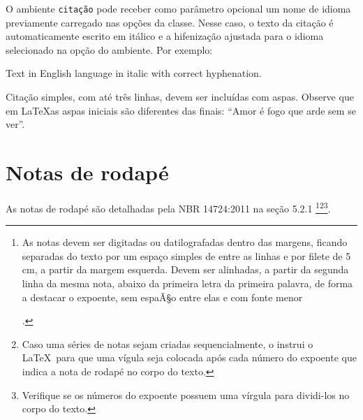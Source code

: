 O ambiente \texttt{citação} pode receber como parâmetro opcional um nome de idioma previamente carregado nas opções da classe. Nesse caso, o texto da citação é automaticamente escrito em itálico e a hifenização ajustada para o idioma selecionado na opção do ambiente. Por exemplo:
\begin{citacao}[english]
	Text in English language in italic with correct hyphenation.
\end{citacao}


Citação simples, com até três linhas, devem ser
incluídas com aspas. Observe que em \LaTeX  as aspas iniciais são diferentes das finais: ``Amor é fogo que arde sem se ver''.


\section{Notas de rodapé}


As notas de rodapé são detalhadas pela NBR 14724:2011 na seção 5.2.1
\footnote{As notas devem ser digitadas ou datilografadas dentro das margens, ficando
	separadas do texto por um espaço simples de entre as linhas e por filete de 5
	cm, a partir da margem esquerda. Devem ser alinhadas, a partir da segunda linha
	da mesma nota, abaixo da primeira letra da primeira palavra, de forma a destacar
	o expoente, sem espaÃ§o entre elas e com fonte menor
	
	.}\footnote{Caso uma séries de notas sejam
	criadas sequencialmente, o \abnTeX  instrui o \LaTeX\ para que uma vígula seja
	colocada após cada número do expoente que indica a nota de rodapé no corpo do
	texto.}\footnote{Verifique se os números do expoente possuem uma vírgula para
	dividi-los no corpo do texto.}.